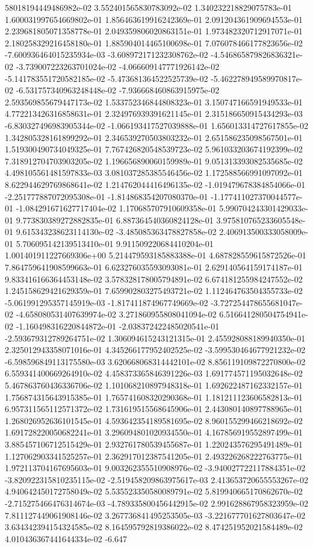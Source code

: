 58018194449486982e-02	3.552401565830783092e-02	1.340232218829075783e-01	1.600031997654669802e-01	1.856463619916242369e-01	2.091204361909694553e-01	2.239681805071358778e-01	2.049359806020863151e-01	1.973482320712917071e-01	2.180258329216458180e-01	1.885904014465100698e-01	7.076078466177823656e-02	-7.600936464015235934e-03	-3.608972171232308762e-02	-4.546865879826836321e-02	-3.739007223263701024e-02	-4.066609147771926142e-02	-5.141783551720582185e-02	-5.473681364522525739e-02	-5.462278949589970817e-02	-6.531757340963248448e-02	-7.936668460863915975e-02	2.593569855679447173e-02	1.533752346844808323e-01	3.150747166591949533e-01	4.772213426316858631e-01	2.324976939391621145e-01	2.315186650915434293e-03	-6.830327496983905344e-02	-1.066193417527039888e-01	1.656013314727617855e-02	1.342805328161899292e-01	2.346539270503803232e-01	2.651586235098567501e-01	1.519300490734049325e-01	7.767426820548539723e-02	5.961033203674192399e-02	7.318912704703903205e-02	1.196656890060159989e-01	9.051313393082535685e-02	4.498105561481597833e-03	3.081037285385546456e-02	1.172588566991097092e-01	8.622944629769868641e-02	1.214762044416496135e-02	-1.019479678384854066e-01	-2.251777887072095308e-01	-1.814868354207080370e-01	-1.177411027370044577e-01	-1.084291671627717404e-02	1.170685707910609358e-01	5.990704243301429033e-01	9.773830389272882835e-01	6.887364540360824128e-01	3.975810765233605548e-01	9.615343238623114130e-02	-3.485085363478827858e-02	2.406913500333058009e-01	5.706095142139513410e-01	9.911509220684410204e-01	1.001401911227669306e+00	5.214479593185883388e-01	4.687828559615872526e-01	7.864759641908599663e-01	6.623276035593093081e-01	2.629140564159174187e-01	9.833416166364453148e-02	3.578328178005794891e-02	6.674181255984247552e-02	1.245158629421629359e-01	7.659902803275493721e-02	1.112464763504355733e-02	-5.061991295357145919e-03	-1.817411874967749669e-02	-3.727254478655681047e-02	-4.658080531407639974e-02	3.271860955808041094e-02	6.516641280504754941e-02	-1.160498316220844872e-01	-2.038372422485020541e-01	-2.593679312789264751e-02	1.306094615243121315e-01	2.455928088189940350e-01	2.325012943358071016e-01	4.345266177952402525e-02	-3.599530464677921232e-02	-6.598596849113175580e-03	3.620668068314442101e-02	8.856119109872270800e-02	6.559341400669264910e-02	4.458373365846391226e-03	1.691774571195032648e-02	5.467863760436336706e-02	1.101068210897948318e-01	1.692622487162332157e-01	1.756874315643915385e-01	1.765741608320290368e-01	1.181211123606582813e-01	6.957311565112571372e-02	1.731619515568645906e-01	2.443080140897788965e-01	1.268026952636101545e-01	4.593642354189581695e-02	8.960155299466218692e-02	1.691728220050682241e-01	3.296094801020934550e-01	4.167856919552897499e-01	3.885457106712515429e-01	2.932761780539455687e-01	1.220243576295491489e-01	1.127062903341525257e-01	2.362917012387541205e-01	2.493226268222763775e-01	1.972113704167695603e-01	9.003262355510908976e-02	-3.940027722117884351e-02	-3.820922315810235115e-02	-2.519458209863975617e-03	2.413653720655553267e-02	4.940642450172758049e-02	5.535523350580089791e-02	5.819940665170862670e-02	-2.715275466476314674e-03	-4.789335800456442915e-02	2.991628867958323959e-02	7.811127449061908146e-02	3.267736841495253505e-03	-3.221677701627803647e-02	3.634342394154324585e-02	8.164595792819386022e-02	8.474251952021584489e-02	4.010436367441644334e-02	-6.647